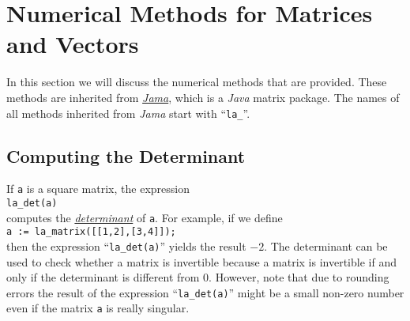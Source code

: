 \section{Numerical Methods for Matrices and Vectors}
In this section we will discuss the numerical methods that are provided.  These methods are inherited
from \href{http://math.nist.gov/javanumerics/jama/}{\textsl{Jama}}, which is a \textsl{Java} matrix
package.  The names of all methods inherited from \textsl{Jama} start with ``\texttt{la\_}''.

\subsection{Computing the Determinant}
If \texttt{a} is a square matrix, the expression 
\\[0.2cm]
\hspace*{1.3cm}
\texttt{la\_det(a)}
\\[0.2cm]
computes the \href{http://en.wikipedia.org/wiki/Determinant}{\emph{determinant}} of \texttt{a}.
For example, if we define 
\\[0.2cm]
\hspace*{1.3cm}
\texttt{a := la\_matrix([[1,2],[3,4]]);}
\\[0.2cm]
then the expression ``\texttt{la\_det(a)}'' yields the result $-2$.  The determinant can be used to
check whether a matrix is invertible because a matrix is invertible if and only if the determinant
is different from $0$.  However, note that due to rounding errors the result of the expression 
``\texttt{la\_det(a)}''  might be a small non-zero number even if the matrix \texttt{a} is really
singular. 

